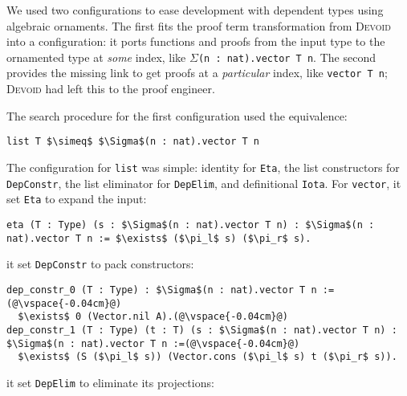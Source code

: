 We used two configurations to ease development with dependent types using algebraic ornaments.
The first fits the proof term transformation from \textsc{Devoid} into a \toolname configuration:
it ports functions and proofs from the input type to the ornamented type at \textit{some} index,
like $\Sigma$\lstinline{(n : nat).vector T n}.
The second provides the missing link to get proofs at a \textit{particular} index, like \lstinline{vector T n};
\textsc{Devoid} had left this to the proof engineer.

The search procedure for the first configuration used the equivalence:

\begin{lstlisting}
list T $\simeq$ $\Sigma$(n : nat).vector T n
\end{lstlisting}
The configuration for \lstinline{list} was simple: identity for \lstinline{Eta},
the list constructors for \lstinline{DepConstr}, the list eliminator for \lstinline{DepElim},
and definitional \lstinline{Iota}.
For \lstinline{vector}, it set \lstinline{Eta} to expand the input:

\begin{lstlisting}[backgroundcolor=\color{cyan!30}]
eta (T : Type) (s : $\Sigma$(n : nat).vector T n) : $\Sigma$(n : nat).vector T n := $\exists$ ($\pi_l$ s) ($\pi_r$ s).
\end{lstlisting}
it set \lstinline{DepConstr} to pack constructors: %

\begin{lstlisting}[backgroundcolor=\color{cyan!30}]
dep_constr_0 (T : Type) : $\Sigma$(n : nat).vector T n :=(@\vspace{-0.04cm}@)
  $\exists$ 0 (Vector.nil A).(@\vspace{-0.04cm}@)
dep_constr_1 (T : Type) (t : T) (s : $\Sigma$(n : nat).vector T n) : $\Sigma$(n : nat).vector T n :=(@\vspace{-0.04cm}@)
  $\exists$ (S ($\pi_l$ s)) (Vector.cons ($\pi_l$ s) t ($\pi_r$ s)).
\end{lstlisting}
it set \lstinline{DepElim} to eliminate its projections:

